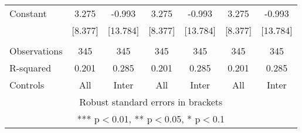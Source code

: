 \begin{tabular}{lcccccc}
Constant & 3.275 & -0.993 & 3.275 & -0.993 & 3.275 & -0.993 \\
 & [8.377] & [13.784] & [8.377] & [13.784] & [8.377] & [13.784] \\
 &  &  &  &  &  &  \\
Observations & 345 & 345 & 345 & 345 & 345 & 345 \\
R-squared & 0.201 & 0.285 & 0.201 & 0.285 & 0.201 & 0.285 \\
 Controls & All & Inter & All & Inter & All & Inter \\ \hline
\multicolumn{7}{c}{ Robust standard errors in brackets} \\
\multicolumn{7}{c}{ *** p$<$0.01, ** p$<$0.05, * p$<$0.1} \\
\end{tabular}

